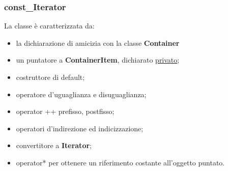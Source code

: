 {{			\subsubsection{const\_Iterator}{
				La classe è caratterizzata da:
				\begin{itemize}\itemsep=0.5pt
					\item la dichiarazione di amicizia con la classe \textbf{Container}
					\item un puntatore a \textbf{ContainerItem}, dichiarato \underline{privato};
					\item costruttore di default;
					\item operatore d'uguaglianza e disuguaglianza;
					\item operator ++ prefisso, postfisso;
					\item operatori d'indirezione ed indicizzazione;
					\item convertitore a \textbf{Iterator};
					\item operator* per ottenere un riferimento costante all'oggetto puntato.
				\end{itemize}
			}
}}
